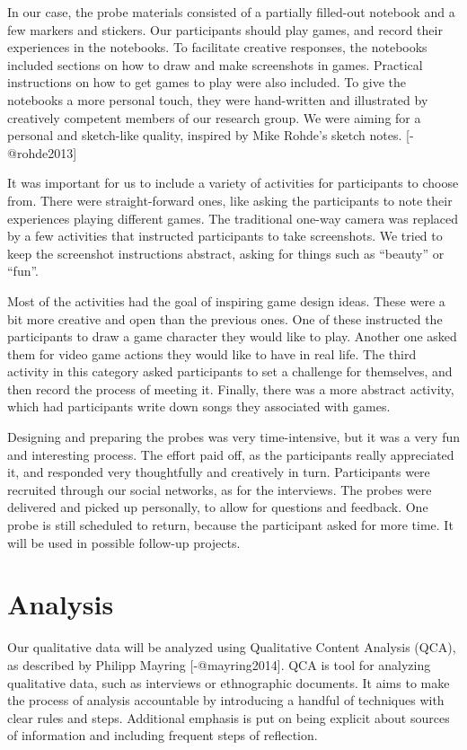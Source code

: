 \documentclass[]{vutinfth}
\begin{document}
In our case, the probe materials consisted of a partially filled-out
notebook and a few markers and stickers. Our participants should play
games, and record their experiences in the notebooks. To facilitate
creative responses, the notebooks included sections on how to draw and
make screenshots in games. Practical instructions on how to get games to
play were also included. To give the notebooks a more personal touch,
they were hand-written and illustrated by creatively competent members
of our research group. We were aiming for a personal and sketch-like
quality, inspired by Mike Rohde's sketch notes. {[}-@rohde2013{]}

It was important for us to include a variety of activities for
participants to choose from. There were straight-forward ones, like
asking the participants to note their experiences playing different
games. The traditional one-way camera was replaced by a few activities
that instructed participants to take screenshots. We tried to keep the
screenshot instructions abstract, asking for things such as ``beauty''
or ``fun''.

Most of the activities had the goal of inspiring game design ideas.
These were a bit more creative and open than the previous ones. One of
these instructed the participants to draw a game character they would
like to play. Another one asked them for video game actions they would
like to have in real life. The third activity in this category asked
participants to set a challenge for themselves, and then record the
process of meeting it. Finally, there was a more abstract activity,
which had participants write down songs they associated with games.

Designing and preparing the probes was very time-intensive, but it was a
very fun and interesting process. The effort paid off, as the
participants really appreciated it, and responded very thoughtfully and
creatively in turn. Participants were recruited through our social
networks, as for the interviews. The probes were delivered and picked up
personally, to allow for questions and feedback. One probe is still
scheduled to return, because the participant asked for more time. It
will be used in possible follow-up projects.

\hypertarget{analysis}{%
\chapter{Analysis}\label{analysis}}

Our qualitative data will be analyzed using Qualitative Content Analysis
(QCA), as described by Philipp Mayring {[}-@mayring2014{]}. QCA is tool
for analyzing qualitative data, such as interviews or ethnographic
documents. It aims to make the process of analysis accountable by
introducing a handful of techniques with clear rules and steps.
Additional emphasis is put on being explicit about sources of
information and including frequent steps of reflection.
\end{document}

